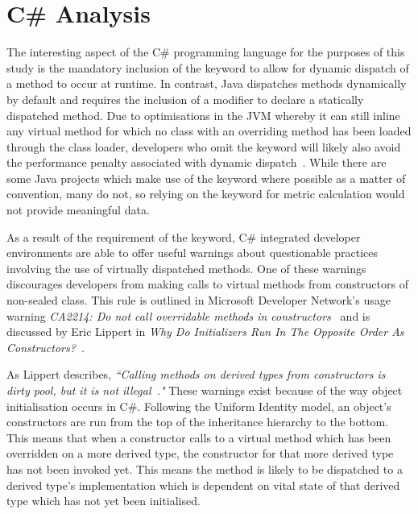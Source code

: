 \section{C\# Analysis}
\label{CSharpLit}
The interesting aspect of the C\# programming language for the purposes of this study is the mandatory inclusion of the  keyword to allow for dynamic dispatch of a method to occur at runtime. In contrast, Java dispatches methods dynamically by default and requires the inclusion of a  modifier to declare a statically dispatched method. Due to optimisations in the JVM whereby it can still inline any virtual method for which no class with an overriding method has been loaded through the class loader, developers who omit the  keyword will likely also avoid the performance penalty associated with dynamic dispatch~\cite{JavaInlining}. While there are some Java projects which make use of the  keyword where possible as a matter of convention, many do not, so relying on the keyword for metric calculation would not provide meaningful data.
\newline

As a result of the requirement of the  keyword, C\# integrated developer environments are able to offer useful warnings about questionable practices involving the use of virtually dispatched methods. One of these warnings discourages developers from making calls to virtual methods from constructors of non-sealed class. This rule is outlined in Microsoft Developer Network's usage warning \textit{CA2214: Do not call overridable methods in constructors~\cite{OverridableMethodWarning}} and is discussed by Eric Lippert in \textit{Why Do Initializers Run In The Opposite Order As Constructors?~\cite{NoDowncalls}}.
\newline

As Lippert describes, \textit{``Calling methods on derived types from constructors is dirty pool, but it is not illegal~\cite{NoDowncalls}."} These warnings exist because of the way object initialisation occurs in C\#. Following the Uniform Identity model, an object's constructors are run from the top of the inheritance hierarchy to the bottom. This means that when a constructor calls to a virtual method which has been overridden on a more derived type, the constructor for that more derived type has not been invoked yet. This means the method is likely to be dispatched to a derived type's implementation which is dependent on vital state of that derived type which has not yet been initialised.

